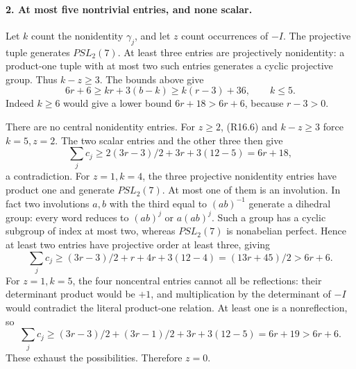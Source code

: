 \paragraph{2. At most five nontrivial entries, and none scalar.}
Let \(k\) count the nonidentity \(\gamma_j\), and let
\(z\) count occurrences of \(-I\). The projective tuple
generates \(PSL_2(7)\). At least three entries are
projectively nonidentity: a product-one tuple with at most
two such entries generates a cyclic projective group.
Thus \(k-z\ge3\). The bounds above give
\[
 6r+6\ge kr+3(b-k)\ge k(r-3)+36,
 \qquad k\le5.                                           \tag{R16.6}
\]
Indeed \(k\ge6\) would give a lower bound
\(6r+18>6r+6\), because \(r-3>0\).

There are no central nonidentity entries. For \(z\ge2\),
(R16.6) and \(k-z\ge3\) force \(k=5,z=2\).
The two scalar entries and the other three then give
\[
 \sum_jc_j\ge 2(3r-3)/2+3r+3(12-5)=6r+18,
                                                               \tag{R16.7}
\]
a contradiction. For \(z=1,k=4\), the three projective
nonidentity entries have product one and generate
\(PSL_2(7)\). At most one of them is an involution.
In fact two involutions \(a,b\) with the third equal
to \((ab)^{-1}\) generate a dihedral group: every word
reduces to \((ab)^j\) or \(a(ab)^j\). Such a group
has a cyclic subgroup of index at most two, whereas
\(PSL_2(7)\) is nonabelian perfect. Hence at least two
entries have projective order at least three, giving
\[
 \sum_jc_j\ge(3r-3)/2+r+4r+3(12-4)
                 =(13r+45)/2>6r+6.                       \tag{R16.8}
\]
For \(z=1,k=5\), the four noncentral entries cannot
all be reflections: their determinant product would be
\(+1\), and multiplication by the determinant of \(-I\)
would contradict the literal product-one relation.
At least one is a nonreflection, so
\[
 \sum_jc_j\ge(3r-3)/2+(3r-1)/2+3r+3(12-5)
                      =6r+19>6r+6.                       \tag{R16.9}
\]
These exhaust the possibilities. Therefore \(z=0\).

